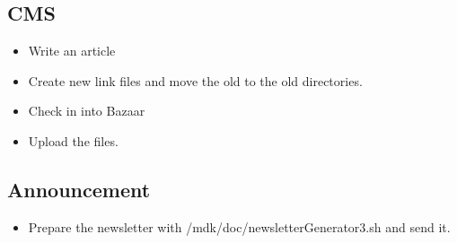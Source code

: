 \subsection{CMS}
\begin{itemize}
	\item Write an article
	\item Create new link files and move the old to the old directories.
	\item Check in into Bazaar
	\item Upload the files.
\end{itemize}


\subsection{Announcement}
\begin{itemize}
	\item Prepare the newsletter with /mdk/doc/newsletterGenerator3.sh and send it.
\end{itemize}